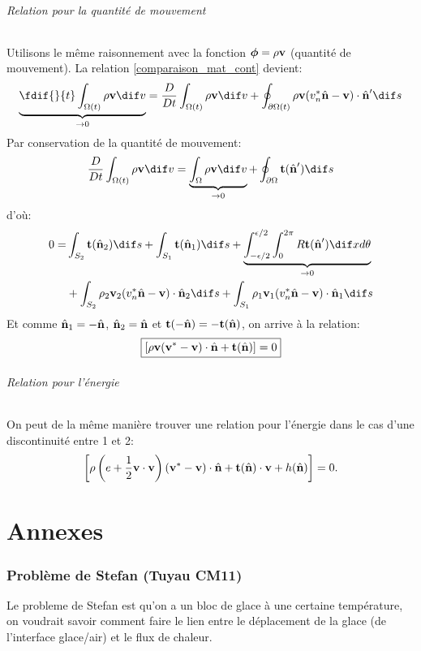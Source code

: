\paragraph{Relation pour la quantité de mouvement}
Utilisons le même raisonnement avec la fonction $\boldsymbol{\phi}=\rho\textbf{v}$ (quantité de mouvement). La relation \ref{comparaison_mat_cont} devient:
$$\underbrace{\fdif{}{t}\int_{\Omega (t)}\rho\fv{v}  \dif v}_{\rightarrow 0}=\frac{D}{Dt}\int_{\Omega (t)}\rho\fv{v}  \dif v+\oint_{\partial \Omega (t)}\rho\fv{v}(v_n^*\hat{\fv{n}}-\fv{v})\cdot \hat{\fv{n}}' \dif s$$
Par conservation de la quantité de mouvement:
$$\frac{D}{Dt}\int_{\Omega (t)}\rho\fv{v}  \dif v = \underbrace{\int_{\Omega}\rho\fv{v} \dif v}_{\rightarrow 0}+\oint_{\partial\Omega}\fv{t}(\hat{\fv{n}}') \dif s$$
d'où:
\begin{align*}
0=&\int_{S_2}\fv{t}(\hat{\fv{n}}_2) \dif s + \int_{S_1}\fv{t}(\hat{\fv{n}}_1) \dif s + \underbrace{\int_{-\epsilon/2}^{\epsilon/2}\int_0^{2\pi}R\fv{t} (\hat{\fv{n}}') \dif xd\theta}_{\rightarrow 0}\\
 &+\int_{S_2}\rho_2\fv{v}_2(v_n^*\hat{\fv{n}}-\fv{v})\cdot\hat{\fv{n}}_2 \dif s + \int_{S_1}\rho_1\fv{v}_1(v_n^*\hat{\fv{n}}-\fv{v})\cdot\hat{\fv{n}}_1 \dif s
\end{align*}
Et comme $\hat{\textbf{n}}_1=-\hat{\textbf{n}}$, $\hat{\textbf{n}}_2=\hat{\textbf{n}}$ et $\textbf{t}(-\hat{\textbf{n}})=-\textbf{t}(\hat{\textbf{n}})$, on arrive à la relation:
$$\boxed{[\rho\textbf{v}(\textbf{v}^*-\textbf{v})\cdot\hat{\textbf{n}}+\textbf{t}(\hat{\textbf{n}})]=0}$$

\paragraph{Relation pour l'énergie}
On peut de la même manière trouver une relation pour l'énergie dans le cas d'une discontinuité entre 1 et 2:
$$\left[\rho\left(e+\frac{1}{2}\textbf{v}\cdot\textbf{v}\right)(\textbf{v}^*-\textbf{v})\cdot\hat{\textbf{n}}+\textbf{t}(\hat{\textbf{n}})\cdot\textbf{v}+h(\hat{\textbf{n}})\right]=0.$$
\paragraph{}
\vspace{3cm}



\appendix
\part{Annexes}
\section{Problème de Stefan (Tuyau CM11)}
Le probleme de Stefan est qu'on a un bloc de glace à une certaine température, on voudrait savoir comment faire le lien entre le déplacement de la glace (de l'interface glace/air) et le flux de chaleur.

